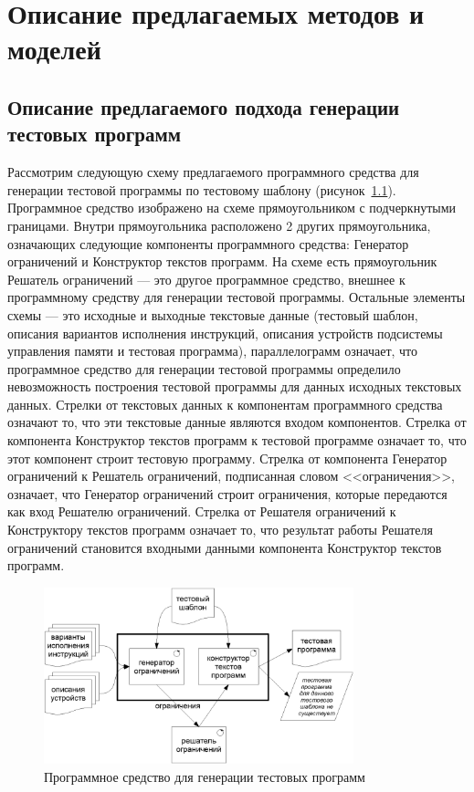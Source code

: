 
\newcommand{\cmpn}[1]{\textsf{#1}}

\chapter{Описание предлагаемых методов и моделей}

\section{Описание предлагаемого подхода генерации тестовых программ}\label{sec:approach}

Рассмотрим следующую схему предлагаемого программного средства для генерации тестовой программы по тестовому шаблону (рисунок~\ref{fig:gen_scheme}). Программное средство изображено на схеме прямоугольником с подчеркнутыми границами. Внутри прямоугольника расположено 2 других прямоугольника, означающих следующие компоненты программного средства: \cmpn{Генератор ограничений} и \cmpn{Конструктор текстов программ}. На схеме есть прямоугольник \cmpn{Решатель ограничений} --- это другое программное средство, внешнее к программному средству для генерации тестовой программы. Остальные элементы схемы --- это исходные и выходные текстовые данные (тестовый шаблон, описания вариантов исполнения инструкций, описания устройств подсистемы управления памяти и тестовая программа), параллелограмм означает, что программное средство для генерации тестовой программы определило невозможность построения тестовой программы для данных исходных текстовых данных. Стрелки от текстовых данных к компонентам программного средства означают то, что эти текстовые данные являются входом компонентов. Стрелка от компонента \cmpn{Конструктор текстов программ} к тестовой программе означает то, что этот компонент строит тестовую программу. Стрелка от компонента \cmpn{Генератор ограничений} к \cmpn{Решатель ограничений}, подписанная словом <<ограничения>>, означает, что \cmpn{Генератор ограничений} строит ограничения, которые передаются как вход \cmpn{Решателю ограничений}. Стрелка от \cmpn{Решателя ограничений} к \cmpn{Конструктору текстов программ} означает то, что результат работы \cmpn{Решателя ограничений} становится входными данными компонента \cmpn{Конструктор текстов программ}.

\begin{figure}[h] \center
  \includegraphics[width=0.8\textwidth]{2.theor/scheme}
  \caption{Программное средство для генерации тестовых программ}\label{fig:gen_scheme}
\end{figure}

